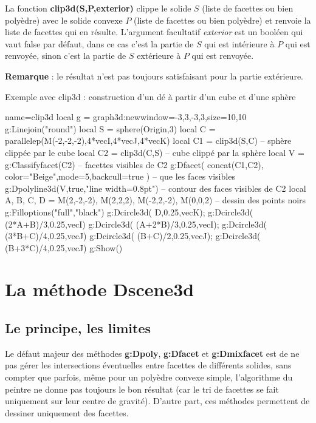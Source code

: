 La fonction \textbf{clip3d(S,P,exterior)} clippe le solide $S$ (liste de facettes ou bien polyèdre) avec le solide convexe $P$ (liste de facettes ou bien polyèdre) et renvoie la liste de facettes qui en résulte. L'argument facultatif \emph{exterior} est un booléen qui vaut false par défaut, dans ce cas c'est la partie de $S$ qui est intérieure à $P$ qui est renvoyée, sinon c'est la partie de $S$ extérieure à $P$ qui est renvoyée.\par
\textbf{Remarque} : le résultat n'est pas toujours satisfaisant pour la partie extérieure.

\begin{demo}[clip3d]{Exemple avec clip3d : construction d'un dé à partir d'un cube et d'une sphère}
\begin{luadraw}{name=clip3d}
local g = graph3d:new{window={-3,3,-3,3},size={10,10}}
g:Linejoin("round")
local S = sphere(Origin,3)
local C = parallelep(M(-2,-2,-2),4*vecI,4*vecJ,4*vecK)
local C1 = clip3d(S,C) -- sphère clippée par le cube
local C2 = clip3d(C,S) -- cube clippé par la sphère
local V = g:Classifyfacet(C2) -- facettes visibles de C2
g:Dfacet( concat(C1,C2), {color="Beige",mode=5,backcull=true} ) -- que les faces visibles
g:Dpolyline3d(V,true,"line width=0.8pt") -- contour des faces visibles de C2
local A, B, C, D = M(2,-2,-2), M(2,2,2), M(-2,2,-2), M(0,0,2) -- dessin des points noirs
g:Filloptions("full","black")
g:Dcircle3d( D,0.25,vecK); g:Dcircle3d( (2*A+B)/3,0.25,vecI)
g:Dcircle3d( (A+2*B)/3,0.25,vecI); g:Dcircle3d( (3*B+C)/4,0.25,vecJ)
g:Dcircle3d( (B+C)/2,0.25,vecJ); g:Dcircle3d( (B+3*C)/4,0.25,vecJ)
g:Show()            
\end{luadraw}
\end{demo}

\section{La méthode Dscene3d}

\subsection{Le principe, les limites}

Le défaut majeur des méthodes \textbf{g:Dpoly}, \textbf{g:Dfacet} et \textbf{g:Dmixfacet} est de ne pas gérer les intersections éventuelles entre facettes de différents solides, sans compter que parfois, même pour un polyèdre convexe simple, l'algorithme du peintre ne donne pas toujours le bon résultat (car le tri de facettes se fait uniquement sur leur centre de gravité). D'autre part, ces méthodes permettent de dessiner uniquement des facettes.

